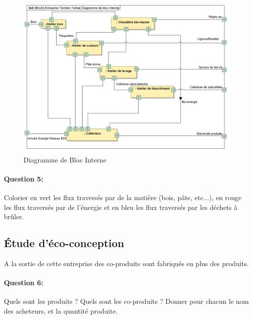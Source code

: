 \begin{figure}[!h]
\begin{center}
\includegraphics[width=\linewidth]{img/Tartas_interne}
\caption{Diagramme de Bloc Interne}
\label{fig:tartas_in}
\end{center}
\end{figure}

\paragraph{Question 5:} Colorier en vert les flux traversés par de la matière (bois, pâte, etc...), en rouge les flux traversés par de l'énergie et en bleu les flux traversés par les déchets à brûler.

\subsection{Étude d'éco-conception}

A la sortie de cette entreprise des co-produits sont fabriqués en plus des produits. 

\paragraph{Question 6:} Quels sont les produits ? Quels sont les co-produits ? Donner pour chacun le nom des acheteurs, et la quantité produite.

\newpage
\clearpage


\newpage

